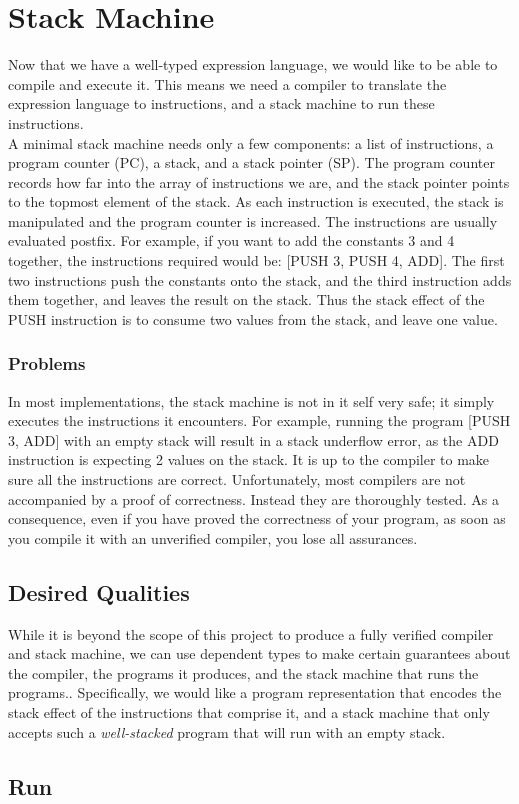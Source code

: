 \section{Stack Machine}
\label{sec:stack-machine}
Now that we have a well-typed expression language, we would like to be able to compile and execute it. This means we need a compiler to translate the expression language to instructions, and a stack machine to run these instructions.
\\
A minimal stack machine needs only a few components: a list of instructions, a program counter (PC), a stack, and a stack pointer (SP). The program counter records how far into the array of instructions we are, and the stack pointer points to the topmost element of the stack. As each instruction is executed, the stack is manipulated and the program counter is increased. The instructions are usually evaluated postfix. For example, if you want to add the constants 3 and 4 together, the instructions required would be: [PUSH 3, PUSH 4, ADD]. The first two instructions push the constants onto the stack, and the third instruction adds them together, and leaves the result on the stack. Thus the stack effect of the PUSH instruction is to consume two values from the stack, and leave one value.

\subsubsection{Problems}
In most implementations, the stack machine is not in it self very safe; it simply executes the instructions it encounters. For example, running the program [PUSH 3, ADD] with an empty stack will result in a stack underflow error, as the ADD instruction is expecting 2 values on the stack. It is up to the compiler to make sure all the instructions are correct. Unfortunately, most compilers are not accompanied by a proof of correctness. Instead they are thoroughly tested. As a consequence, even if you have proved the correctness of your program, as soon as you compile it with an unverified compiler, you lose all assurances. \cite{Leroy_formalverification}

\subsection{Desired Qualities}
While it is beyond the scope of this project to produce a fully verified compiler and stack machine, we can use dependent types to make certain guarantees about the compiler, the programs it produces, and the stack machine that runs the programs.. Specifically, we would like a program representation that encodes the stack effect of the instructions that comprise it, and a stack machine that only accepts such a \textit{well-stacked} program that will run with an empty stack.



\subsection{Run}
